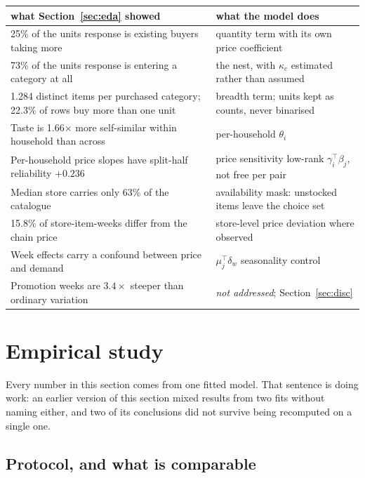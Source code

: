 \documentclass[11pt]{article}
\begin{document}
\begin{center}
\begin{tabular}{p{}p{}}
\toprule
what Section~\ref{sec:eda} showed & what the model does \\
\midrule
25\% of the units response is existing buyers taking more &
quantity term with its own price coefficient \\
73\% of the units response is entering a category at all &
the nest, with $\kappa_c$ estimated rather than assumed \\
1.284 distinct items per purchased category; 22.3\% of rows buy more than one unit &
breadth term; units kept as counts, never binarised \\
Taste is 1.66$\times$ more self-similar within household than across &
per-household $\theta_i$ \\
Per-household price slopes have split-half reliability $+0.236$ &
price sensitivity low-rank $\gamma_i^{\top}\beta_j$, not free per pair \\
Median store carries only 63\% of the catalogue &
availability mask: unstocked items leave the choice set \\
15.8\% of store-item-weeks differ from the chain price &
store-level price deviation where observed \\
Week effects carry a confound between price and demand &
$\mu_j^{\top}\delta_w$ seasonality control \\
Promotion weeks are $3.4\times$ steeper than ordinary variation &
\emph{not addressed}; Section~\ref{sec:disc} \\
\bottomrule
\end{tabular}
\end{center}

\section{Empirical study}
\label{sec:emp}

Every number in this section comes from one fitted model. That sentence is doing work: an
earlier version of this section mixed results from two fits without naming either, and two
of its conclusions did not survive being recomputed on a single one.

\subsection{Protocol, and what is comparable}
\label{sec:protocol}
\end{document}
